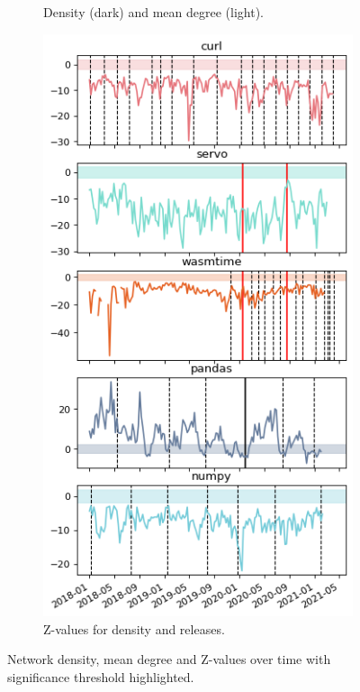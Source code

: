 \begin{figure}[!htbp]
\begin{subfigure}{0.53\textwidth}
        \caption{Density (dark) and mean degree (light).}
        \label{fig:density_a}
    \end{subfigure}
    \begin{subfigure}{0.46\textwidth}
        \centering
        \includegraphics[width=\textwidth]{figures/qualitative/mean_deg_density/mean_deg_z_values.png}
        \caption{Z-values for density and releases.}
        \label{fig:density_b}
    \end{subfigure}
    \caption{Network density, mean degree and Z-values over time with significance threshold highlighted.}
    \label{fig:density}
\end{figure}

